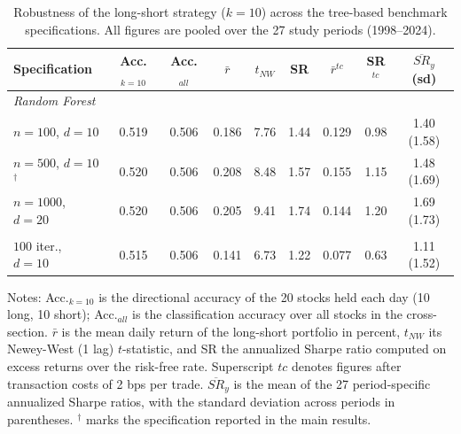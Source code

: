 \begin{table}[htbp]
\centering
\caption{Robustness of the long-short strategy ($k=10$) across the tree-based benchmark specifications. All figures are pooled over the 27 study periods (1998--2024).}
\label{tab:robustness_benchmark}
\small
\begin{tabular}{lcccccccc}
\toprule
Specification & Acc.$_{k=10}$ & Acc.$_{all}$ & $\bar{r}$ & $t_{NW}$ & SR & $\bar{r}^{tc}$ & SR$^{tc}$ & $\overline{SR}_{y}$ (sd) \\
\midrule
\multicolumn{9}{l}{\textit{Random Forest}} \\
\quad $n=100$, $d=10$ & 0.519 & 0.506 & 0.186 & 7.76 & 1.44 & 0.129 & 0.98 & 1.40 (1.58) \\
\quad $n=500$, $d=10$$^{\dagger}$ & 0.520 & 0.506 & 0.208 & 8.48 & 1.57 & 0.155 & 1.15 & 1.48 (1.69) \\
\quad $n=1000$, $d=20$ & 0.520 & 0.506 & 0.205 & 9.41 & 1.74 & 0.144 & 1.20 & 1.69 (1.73) \\
\addlinespace
\multicolumn{9}{l}{\textit{Grad. Boosting}} \\
\quad $100$ iter., $d=10$ & 0.515 & 0.506 & 0.141 & 6.73 & 1.22 & 0.077 & 0.63 & 1.11 (1.52) \\
\bottomrule
\end{tabular}
\begin{minipage}{\textwidth}\vspace{2mm}\footnotesize
Notes: Acc.$_{k=10}$ is the directional accuracy of the 20 stocks held each day (10 long, 10 short); Acc.$_{all}$ is the classification accuracy over all stocks in the cross-section. $\bar{r}$ is the mean daily return of the long-short portfolio in percent, $t_{NW}$ its Newey-West (1 lag) $t$-statistic, and SR the annualized Sharpe ratio computed on excess returns over the risk-free rate. Superscript $tc$ denotes figures after transaction costs of 2 bps per trade. $\overline{SR}_{y}$ is the mean of the 27 period-specific annualized Sharpe ratios, with the standard deviation across periods in parentheses. $^{\dagger}$ marks the specification reported in the main results.
\end{minipage}
\end{table}
